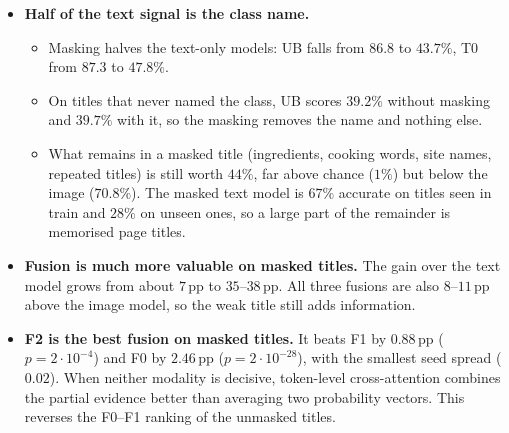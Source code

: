 \begin{table}[H]
  \centering\small
  \caption{E2. Every model is retrained and tested on titles in which every class-name mention is replaced by
  \texttt{[MASK]}. ``Gain over UB'' is the macro-F1 gain of the fusion over the text model of the same seed.}
  \label{tab:e2}
\end{table}

\begin{itemize}
  \item \textbf{Half of the text signal is the class name.}
        \begin{itemize}
          \item Masking halves the text-only models: UB falls from $86.8$ to $43.7\%$, T0 from $87.3$ to $47.8\%$.
          \item On titles that never named the class, UB scores $39.2\%$ without masking and $39.7\%$ with it, so
                the masking removes the name and nothing else.
          \item What remains in a masked title (ingredients, cooking words, site names, repeated titles) is still
                worth $44\%$, far above chance ($1\%$) but below the image ($70.8\%$). The masked text model is
                $67\%$ accurate on titles seen in train and $28\%$ on unseen ones, so a large part of the
                remainder is memorised page titles.
        \end{itemize}
  \item \textbf{Fusion is much more valuable on masked titles.} The gain over the text model grows from about
        $7$\,pp to $35$--$38$\,pp. All three fusions are also $8$--$11$\,pp above the image model, so the weak
        title still adds information.
  \item \textbf{F2 is the best fusion on masked titles.} It beats F1 by $0.88$\,pp ($p=2\cdot10^{-4}$) and F0 by
        $2.46$\,pp ($p=2\cdot10^{-28}$), with the smallest seed spread ($0.02$). When neither modality is decisive,
        token-level cross-attention combines the partial evidence better than averaging two probability vectors.
        This reverses the F0--F1 ranking of the unmasked titles.
\end{itemize}

